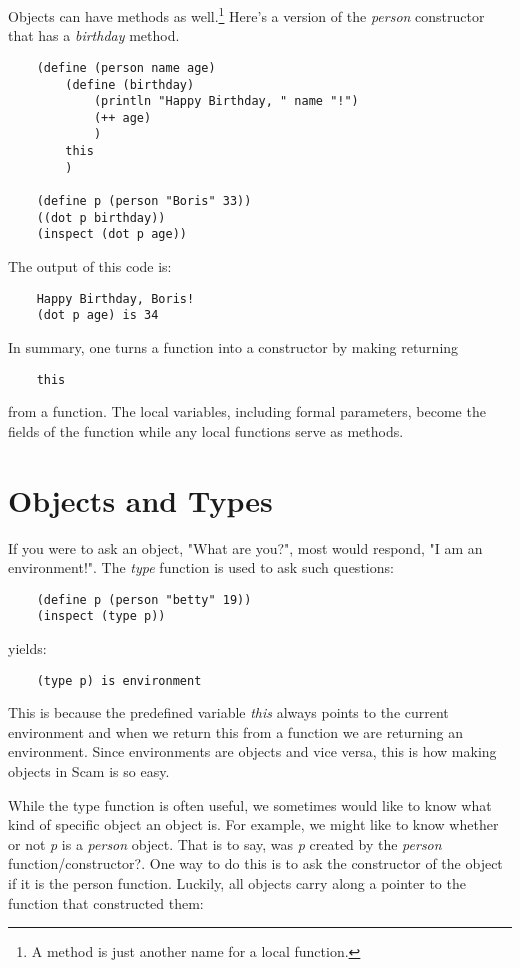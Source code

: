 Objects can have methods as well.\footnote{
A method is just another name for a local function.
}
Here's a version of the
{\it person} constructor that has a {\it birthday} method.

\begin{verbatim}
    (define (person name age)
        (define (birthday)
            (println "Happy Birthday, " name "!")
            (++ age)
            )
        this
        )
        
    (define p (person "Boris" 33))
    ((dot p birthday))
    (inspect (dot p age))
\end{verbatim}

The output of this code is:

\begin{verbatim}
    Happy Birthday, Boris!
    (dot p age) is 34
\end{verbatim}

In summary, one turns a function into a constructor by making returning

\begin{verbatim}
    this
\end{verbatim}

from a function. The local variables, including
formal parameters, become the fields of the function while
any local functions serve as methods.

\section{Objects and Types}

If you were to ask an object, "What are you?", most
would respond, "I am an environment!". The {\it type} function is
used to ask such questions:

\begin{verbatim}
    (define p (person "betty" 19))
    (inspect (type p))
\end{verbatim}

yields:

\begin{verbatim}
    (type p) is environment
\end{verbatim}

This is because the predefined variable {\it this} always points to
the current environment and when we return this from a function
we are returning an environment. Since environments are objects
and vice versa, this is how making objects in Scam is so easy.

While the type function is often useful, we sometimes 
would like to know what kind of specific object an object is.
For example, we might like to 
know whether or not {\it p} is a {\it person} object.
That is to say,
was {\it p} created by the {\it person} function/constructor?.
One way to do this
is to ask the constructor of the object if it is the person function.
Luckily, all objects carry along a pointer to the function
that constructed them:

